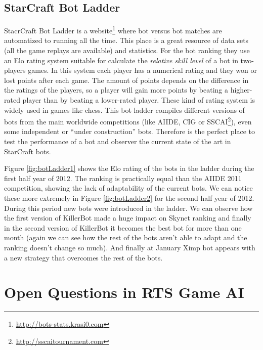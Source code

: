 \documentclass[journal]{IEEEtran}
\begin{document}
\subsection{StarCraft Bot Ladder}\label{sec:cig2011}

StacrCraft Bot Ladder is a website\footnote{\url{http://bots-stats.krasi0.com}} where bot versus bot matches are automatized to running all the time. This place is a great resource of data sets (all the game replays are available) and statistics. For the bot ranking they use an Elo rating system suitable for calculate the \emph{relative skill level} of a bot in two-players games. In this system each player has a numerical rating and they won or lost points after each game. The amount of points depends on the difference in the ratings of the players, so a player will gain more points by beating a higher-rated player than by beating a lower-rated player. These kind of rating system is widely used in games like chess.
This bot ladder compiles different versions of bots from the main worldwide competitions (like AIIDE, CIG or SSCAI\footnote{\url{http://sscaitournament.com}}), even some independent or ``under construction'' bots. Therefore is the perfect place to test the performance of a bot and observer the current state of the art in StarCraft bots.

Figure \ref{fig:botLadder1} shows the Elo rating of the bots in the ladder during the first half year of 2012. The ranking is practically equal than the AIIDE 2011 competition, showing the lack of adaptability of the current bots. We can notice these more extremely in Figure \ref{fig:botLadder2} for the second half year of 2012. During this period new bots were introduced in the ladder. We can observe how the first version of KillerBot made a huge impact on Skynet ranking and finally in the second version of KillerBot it becomes the best bot for more than one month (again we can see how the rest of the bots aren't able to adapt and the ranking doesn't change so much). And finally at January Ximp bot appears with a new strategy that overcomes the rest of the bots.



\section{Open Questions in RTS Game AI}\label{sec:questions}
\end{document}
